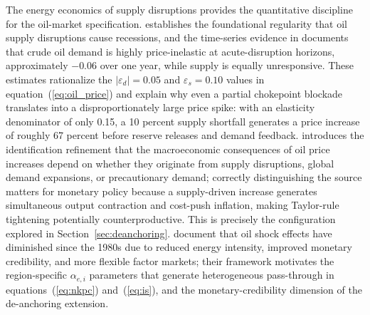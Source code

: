 \documentclass[12pt]{article}
\begin{document}
The energy economics of supply disruptions provides the quantitative discipline for the oil-market specification. \citet{hamilton1983oil} establishes the foundational regularity that oil supply disruptions cause recessions, and the time-series evidence in \citet{hamilton2009understanding} documents that crude oil demand is highly price-inelastic at acute-disruption horizons, approximately $-0.06$ over one year, while supply is equally unresponsive. These estimates rationalize the $|\varepsilon_d| = 0.05$ and $\varepsilon_s = 0.10$ values in equation~(\ref{eq:oil_price}) and explain why even a partial chokepoint blockade translates into a disproportionately large price spike: with an elasticity denominator of only 0.15, a 10 percent supply shortfall generates a price increase of roughly 67 percent before reserve releases and demand feedback. \citet{kilian2009not} introduces the identification refinement that the macroeconomic consequences of oil price increases depend on whether they originate from supply disruptions, global demand expansions, or precautionary demand; correctly distinguishing the source matters for monetary policy because a supply-driven increase generates simultaneous output contraction and cost-push inflation, making Taylor-rule tightening potentially counterproductive. This is precisely the configuration explored in Section~\ref{sec:deanchoring}. \citet{blanchard2007macroeconomic} document that oil shock effects have diminished since the 1980s due to reduced energy intensity, improved monetary credibility, and more flexible factor markets; their framework motivates the region-specific $\alpha_{e,i}$ parameters that generate heterogeneous pass-through in equations~(\ref{eq:nkpc}) and~(\ref{eq:is}), and the monetary-credibility dimension of the de-anchoring extension.
\end{document}
